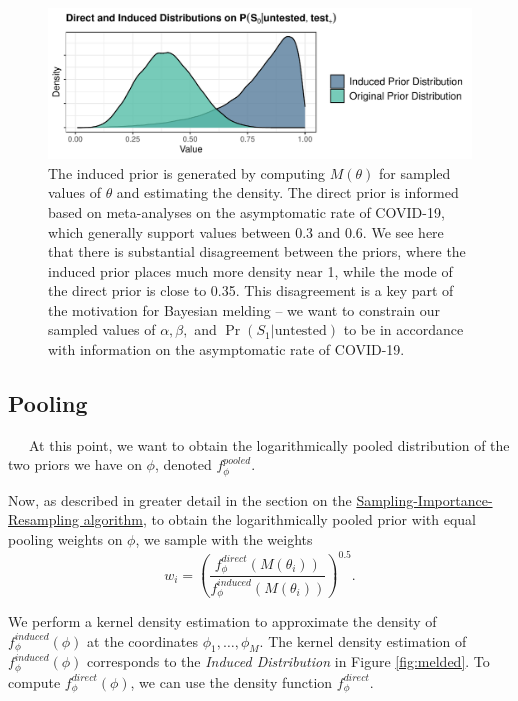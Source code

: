 \documentclass[12pt,twoside]{smiththesis}
\begin{document}
\begin{figure}

{\centering \includegraphics[width=1\linewidth]{figure/induced-direct} 

}

\caption{\label{fig:prior-induced}The induced prior is generated by computing $M(\theta)$ for sampled values of $\theta$ and estimating the density. The direct prior is informed based on meta-analyses on the asymptomatic rate of COVID-19, which generally support values between 0.3 and 0.6. We see here that there is substantial disagreement between the priors, where the induced prior places much more density near 1, while the mode of the direct prior is close to 0.35. This disagreement is a key part of the motivation for Bayesian melding -- we want to constrain our sampled values of $\alpha,\beta,$ and $\Pr(S_1|\text{untested})$ to be in accordance with information on the asymptomatic rate of COVID-19.}\label{fig:unnamed-chunk-18}
\end{figure}
\hypertarget{pooling}{%
\subsection{Pooling}\label{pooling}}

~~~At this point, we want to obtain the logarithmically pooled distribution of the two priors we have on \(\phi\), denoted \(f_\phi^{pooled}\).

Now, as described in greater detail in the section on the \protect\hyperlink{logpooled}{Sampling-Importance-Resampling algorithm}, to obtain the logarithmically pooled prior with equal pooling weights on \(\phi\), we sample with the weights \[w_i = \left( \frac{f_\phi^{direct}(M(\theta_i))}{f_\phi^{induced}(M(\theta_i))} \right)^{0.5}. \tag{1}\]

We perform a kernel density estimation to approximate the density of \(f_\phi^{induced}(\phi)\) at the coordinates \(\phi_1, \dots, \phi_M\). The kernel density estimation of \(f_\phi^{induced}(\phi)\) corresponds to the \emph{Induced Distribution} in Figure \ref{fig:melded}. To compute \(f_\phi^{direct}(\phi)\), we can use the density function \(f_\phi^{direct}\).
\end{document}
